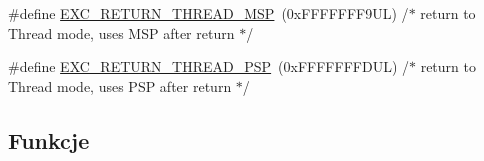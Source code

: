 \begin{DoxyCompactItemize}
\item 
\#define \hyperlink{group___c_m_s_i_s___core___n_v_i_c_functions_gaea4703101b5e679f695e231f7ee72331}{E\+X\+C\+\_\+\+R\+E\+T\+U\+R\+N\+\_\+\+T\+H\+R\+E\+A\+D\+\_\+\+M\+SP}~(0x\+F\+F\+F\+F\+F\+F\+F9\+U\+L)     /$\ast$ return to Thread mode, uses M\+S\+P after return                                $\ast$/
\item 
\#define \hyperlink{group___c_m_s_i_s___core___n_v_i_c_functions_ga9998daf0fbdf31dbc8f81cd604b58175}{E\+X\+C\+\_\+\+R\+E\+T\+U\+R\+N\+\_\+\+T\+H\+R\+E\+A\+D\+\_\+\+P\+SP}~(0x\+F\+F\+F\+F\+F\+F\+F\+D\+U\+L)     /$\ast$ return to Thread mode, uses P\+S\+P after return                                $\ast$/
\end{DoxyCompactItemize}
\subsection*{Funkcje}
